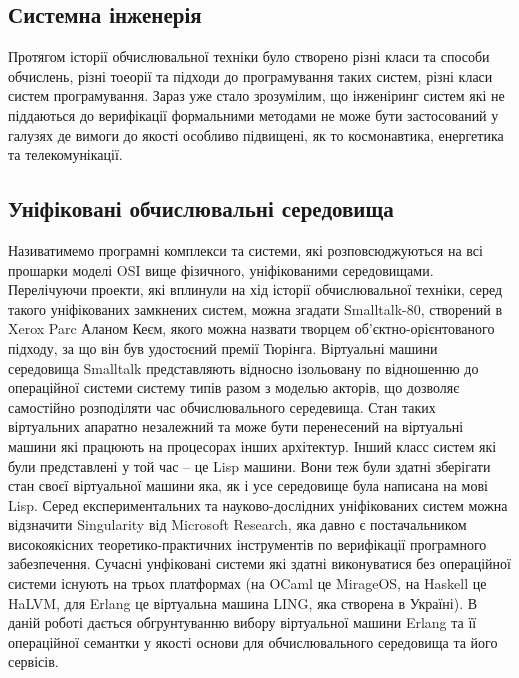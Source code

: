 \documentclass[11pt,oneside]{article}
\begin{document}
\vspace{1cm}


\subsection{Системна інженерія}

   Протягом історії обчислювальної техніки було створено різні класи та способи обчислень,
   різні тоеорії та підходи до програмування таких систем, різні класи систем програмування.
   Зараз уже стало зрозумілим, що інженіринг систем які не піддаються до верифікації
   формальними методами не може бути застосований у галузях де вимоги до якості
   особливо підвищені, як то космонавтика, енергетика та телекомунікації.

\subsection{Уніфіковані обчислювальні середовища}

   Називатимемо програмні комплекси та системи, які розповсюджуються на всі прошарки моделі OSI вище фізичного,
   уніфікованими середовищами. Перелічуючи проекти, які вплинули на хід історії
   обчислювальної техніки, серед такого уніфікованих замкнених систем, можна згадати Smalltalk-80,
   створений в Xerox Parc Аланом Кеєм, якого можна назвати творцем об'єктно-орієнтованого підходу, за що він був
   удостоєний премії Тюрінга. Віртуальні машини середовища Smalltalk представляють відносно ізольовану
   по відношенню до операційної системи систему типів разом з моделью акторів, що дозволяє
   самостійно розподіляти час обчислювального середевища. Стан таких віртуальних апаратно незалежний
   та може бути перенесений на віртуальні машини які працюють на процесорах інших архітектур.
   Інший класс систем які були представлені у той час -- це Lisp машини. Вони теж були
   здатні зберігати стан своєї віртуальної машини яка,
   як і усе середовище була написана на мові Lisp. Серед експериментальних та науково-дослідних
   уніфікованих систем можна відзначити Singularity від Microsoft Research, яка давно є постачальником
   високоякісних теоретико-практичних інструментів по верифікації програмного забезпечення.
   Сучасні унфіковані системи які здатні виконуватися без операційної системи
   існують на трьох платформах (на OCaml це MirageOS, на Haskell це HaLVM,
   для Erlang це віртуальна машина LING, яка створена в Україні). В даній роботі дається обгрунтуванню вибору
   віртуальної машини Erlang та її операційної семантки у якості основи для обчислювального
   середовища та його сервісів.
\end{document}
